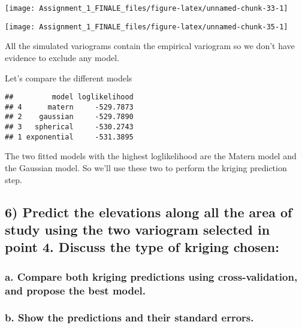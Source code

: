 \documentclass[
]{article}
\begin{document}
\begin{center}\texttt{[image: Assignment\_1\_FINALE\_files/figure-latex/unnamed-chunk-33-1]} \end{center}

\begin{center}\texttt{[image: Assignment\_1\_FINALE\_files/figure-latex/unnamed-chunk-35-1]} \end{center}

All the simulated variograms contain the empirical variogram so we don't
have evidence to exclude any model.

Let's compare the different models

\begin{verbatim}
##         model loglikelihood
## 4      matern     -529.7873
## 2    gaussian     -529.7890
## 3   spherical     -530.2743
## 1 exponential     -531.3895
\end{verbatim}

The two fitted models with the highest loglikelihood are the Matern
model and the Gaussian model. So we'll use these two to perform the
kriging prediction step.

\newpage

\hypertarget{predict-the-elevations-along-all-the-area-of-study-using-the-two-variogram-selected-in-point-4.-discuss-the-type-of-kriging-chosen}{%
\subsection{6) Predict the elevations along all the area of study using
the two variogram selected in point 4. Discuss the type of kriging
chosen:}\label{predict-the-elevations-along-all-the-area-of-study-using-the-two-variogram-selected-in-point-4.-discuss-the-type-of-kriging-chosen}}

\hypertarget{a.-compare-both-kriging-predictions-using-cross-validation-and-propose-the-best-model.}{%
\subsubsection{a. Compare both kriging predictions using
cross-validation, and propose the best
model.}\label{a.-compare-both-kriging-predictions-using-cross-validation-and-propose-the-best-model.}}

\hypertarget{b.-show-the-predictions-and-their-standard-errors.}{%
\subsubsection{b. Show the predictions and their standard
errors.}\label{b.-show-the-predictions-and-their-standard-errors.}}
\end{document}
